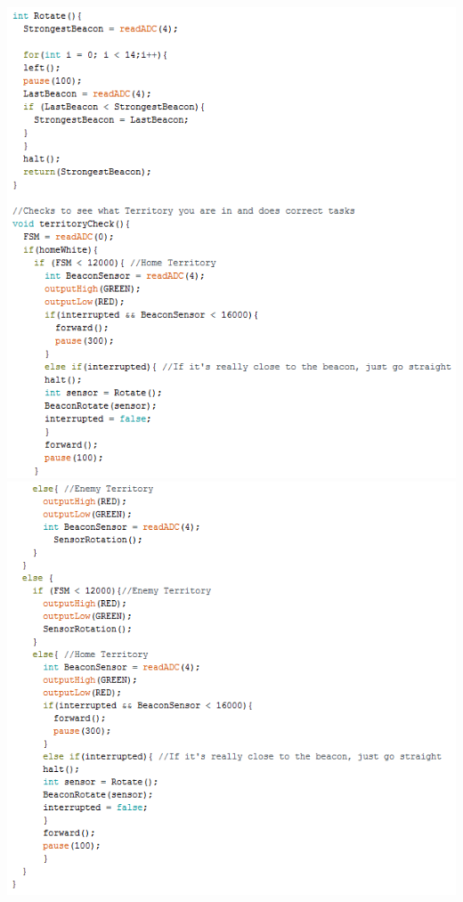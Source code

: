 \documentclass{article}
\begin{document}
\begin{center}
\includegraphics[]{FullCode5.png}
\includegraphics[]{FullCode6.png}
\end{center}
\end{document}
